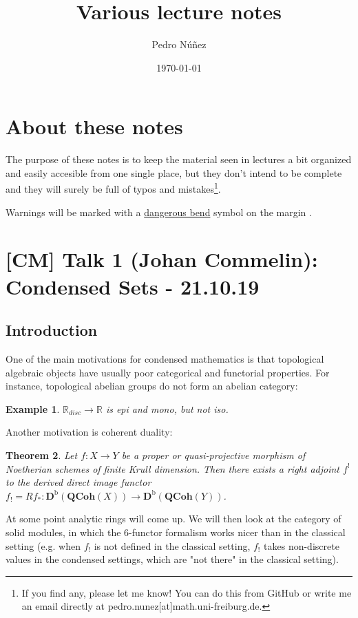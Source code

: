 \documentclass[12pt]{article}
\title{Various lecture notes}
\author{Pedro Núñez}
\date{\today}
\theoremstyle{darkgreentheorem}
\newtheorem{thm}{Theorem}[section]
\theoremstyle{darkbluedefinition}
\theoremstyle{darkredexample}
\newtheorem{exa}[thm]{Example}
\theoremstyle{remark}
\newcommand{\R}{\mathbb{R}}
\newcommand{\1}{\mathbbm{1}}
\newcommand{\Db}{\mathbf{D}^{\mathrm{b}}}
\newcommand{\QCoh}{\mathbf{QCoh}}
\newcommand{\db}{\marginnote{\dbend}}
\begin{document}
\maketitle

\tableofcontents

\section{About these notes}

The purpose of these notes is to keep the material seen in lectures a bit organized and easily accesible from one single place, but they don't intend to be complete and they will surely be full of typos and mistakes\footnote{If you find any, please let me know! You can do this from GitHub or write me an email directly at pedro.nunez[at]math.uni-freiburg.de.}.

Warnings will be marked with a \href{https://en.wikipedia.org/wiki/Bourbaki_dangerous_bend_symbol}{dangerous bend} symbol on the margin \db.

\section{[CM] Talk 1 (Johan Commelin): Condensed Sets - 21.10.19}

\subsection{Introduction}

One of the main motivations for condensed mathematics is that topological algebraic objects have usually poor categorical and functorial properties.
For instance, topological abelian groups do not form an abelian category:

\begin{exa}
    $\R_{disc}\to \R$ is epi and mono, but not iso.
\end{exa}

Another motivation is coherent duality:

\begin{thm}
    Let $f\colon X\to Y$ be a proper or quasi-projective morphism of Noetherian schemes of finite Krull dimension. Then there exists a right adjoint $f^{!}$ to the derived direct image functor $f_{!}=Rf_{*}\colon \Db(\QCoh(X))\to \Db(\QCoh(Y))$.
\end{thm}

At some point analytic rings will come up.
We will then look at the category of solid modules, in which the 6-functor formalism works nicer than in the classical setting (e.g. when $f_{!}$ is not defined in the classical setting, $f_{!}$ takes non-discrete values in the condensed settings, which are "not there" in the classical setting).
\end{document}
